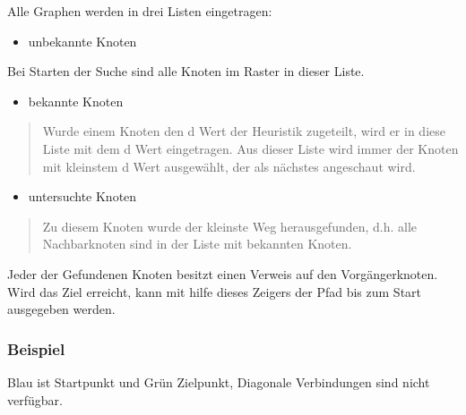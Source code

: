 Alle Graphen werden in drei Listen eingetragen:

\begin{itemize}
\item
  unbekannte Knoten
\end{itemize}

Bei Starten der Suche sind alle Knoten im Raster in dieser Liste.

\begin{itemize}
\item
  bekannte Knoten
\end{itemize}

\begin{quote}
Wurde einem Knoten den d Wert der Heuristik zugeteilt, wird er in diese
Liste mit dem d Wert eingetragen. Aus dieser Liste wird immer der Knoten
mit kleinstem d Wert ausgewählt, der als nächstes angeschaut wird.
\end{quote}

\begin{itemize}
\item
  untersuchte Knoten
\end{itemize}

\begin{quote}
Zu diesem Knoten wurde der kleinste Weg herausgefunden, d.h. alle
Nachbarknoten sind in der Liste mit bekannten Knoten.
\end{quote}

Jeder der Gefundenen Knoten besitzt einen Verweis auf den
Vorgängerknoten. Wird das Ziel erreicht, kann mit hilfe dieses Zeigers
der Pfad bis zum Start ausgegeben werden.
\cite[Schmidt, Fuchs]{asterngeo}

\subsubsection{Beispiel}

Blau ist Startpunkt und Grün Zielpunkt, Diagonale Verbindungen sind
nicht verfügbar.

